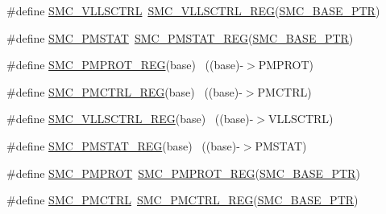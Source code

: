 \begin{DoxyCompactItemize}
\#define \hyperlink{group___s_m_c___register___accessor___macros_gabc1de81f94174f2aaebdc6a51b782fee}{S\+M\+C\+\_\+\+V\+L\+L\+S\+C\+T\+RL}~\hyperlink{group___s_m_c___register___accessor___macros_gaf9878592b3a3adba21106dca7ad03a45}{S\+M\+C\+\_\+\+V\+L\+L\+S\+C\+T\+R\+L\+\_\+\+R\+EG}(\hyperlink{group___s_m_c___peripheral_ga31b6c4571795341e6446800243313e56}{S\+M\+C\+\_\+\+B\+A\+S\+E\+\_\+\+P\+TR})
\item 
\#define \hyperlink{group___s_m_c___register___accessor___macros_ga6311e0572e3a1f7d84e1069716b64307}{S\+M\+C\+\_\+\+P\+M\+S\+T\+AT}~\hyperlink{group___s_m_c___register___accessor___macros_ga77ded725e1d8ccc2781a0ee6dffc8809}{S\+M\+C\+\_\+\+P\+M\+S\+T\+A\+T\+\_\+\+R\+EG}(\hyperlink{group___s_m_c___peripheral_ga31b6c4571795341e6446800243313e56}{S\+M\+C\+\_\+\+B\+A\+S\+E\+\_\+\+P\+TR})
\item 
\#define \hyperlink{group___s_m_c___register___accessor___macros_ga376601b24e540392f6d12424bdaebab4}{S\+M\+C\+\_\+\+P\+M\+P\+R\+O\+T\+\_\+\+R\+EG}(base)                                      ~((base)-\/$>$P\+M\+P\+R\+OT)
\item 
\#define \hyperlink{group___s_m_c___register___accessor___macros_gaa927c65bb4333cf1bcff0d5fa57d8034}{S\+M\+C\+\_\+\+P\+M\+C\+T\+R\+L\+\_\+\+R\+EG}(base)                                      ~((base)-\/$>$P\+M\+C\+T\+RL)
\item 
\#define \hyperlink{group___s_m_c___register___accessor___macros_gaf9878592b3a3adba21106dca7ad03a45}{S\+M\+C\+\_\+\+V\+L\+L\+S\+C\+T\+R\+L\+\_\+\+R\+EG}(base)                                  ~((base)-\/$>$V\+L\+L\+S\+C\+T\+RL)
\item 
\#define \hyperlink{group___s_m_c___register___accessor___macros_ga77ded725e1d8ccc2781a0ee6dffc8809}{S\+M\+C\+\_\+\+P\+M\+S\+T\+A\+T\+\_\+\+R\+EG}(base)                                      ~((base)-\/$>$P\+M\+S\+T\+AT)
\item 
\#define \hyperlink{group___s_m_c___register___accessor___macros_ga43f6628ef790c765722cee208c2c477d}{S\+M\+C\+\_\+\+P\+M\+P\+R\+OT}~\hyperlink{group___s_m_c___register___accessor___macros_ga376601b24e540392f6d12424bdaebab4}{S\+M\+C\+\_\+\+P\+M\+P\+R\+O\+T\+\_\+\+R\+EG}(\hyperlink{group___s_m_c___peripheral_ga31b6c4571795341e6446800243313e56}{S\+M\+C\+\_\+\+B\+A\+S\+E\+\_\+\+P\+TR})
\item 
\#define \hyperlink{group___s_m_c___register___accessor___macros_ga4b2bae0309aecee21e9fe70ac7dbe3dc}{S\+M\+C\+\_\+\+P\+M\+C\+T\+RL}~\hyperlink{group___s_m_c___register___accessor___macros_gaa927c65bb4333cf1bcff0d5fa57d8034}{S\+M\+C\+\_\+\+P\+M\+C\+T\+R\+L\+\_\+\+R\+EG}(\hyperlink{group___s_m_c___peripheral_ga31b6c4571795341e6446800243313e56}{S\+M\+C\+\_\+\+B\+A\+S\+E\+\_\+\+P\+TR})

\end{DoxyCompactItemize}
